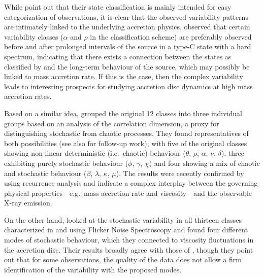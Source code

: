 \documentclass[12pt]{emulateapj}
\begin{document}
While \citet{belloni2000} point out that their state classification is mainly intended for easy categorization of observations, it is clear that the observed variability patterns are intimately linked to the underlying accretion physics. \citet{naik2002} observed that certain variability classes ($\alpha$ and $\rho$ in the \citealt{belloni2000} classification scheme) are preferably observed before and after prolonged intervals of the source in a type-C state with a hard spectrum, indicating that there exists a connection between the states as classified by \citet{belloni2000} and the long-term behaviour of the source, which may possibly be linked to mass accretion rate. If this is the case, then the complex variability leads to interesting prospects for studying accretion disc dynamics at high mass accretion rates. 

Based on a similar idea, \citet{misra2004, misra2006} grouped the original 12 classes into three individual groups based on an analysis of the correlation dimension, a proxy for distinguishing stochastic from chaotic processes. They found representatives of both possibilities (see also \citealt{harikrishnan2011} for follow-up work), with five of the original classes showing non-linear deterministic (i.e.\ chaotic) behaviour ($\theta$, $\rho$, $\alpha$, $\nu$, $\delta$), three exhibiting purely stochastic behaviour ($\phi$, $\gamma$, $\chi$) and four showing a mix of chaotic and stochastic behaviour ($\beta$, $\lambda$, $\kappa$, $\mu$). The results were recently confirmed by \citet{sukova2016} using recurrence analysis and indicate a complex interplay between the governing physical properties---e.g.\ mass accretion rate and viscosity---and the observable X-ray emission.

On the other hand, \citet{polyakov2012} looked at the stochastic variability in all thirteen classes characterized in \citet{belloni2000} and \citet{kleinwolt2002} using Flicker Noise Spectroscopy and found four different modes of stochastic behaviour, which they connected to viscosity fluctuations in the accretion disc. Their results broadly agree with those of \citet{misra2006}, though they point out that for some observations, the quality of the data does not allow a firm identification of the variability with the proposed modes.
\end{document}
